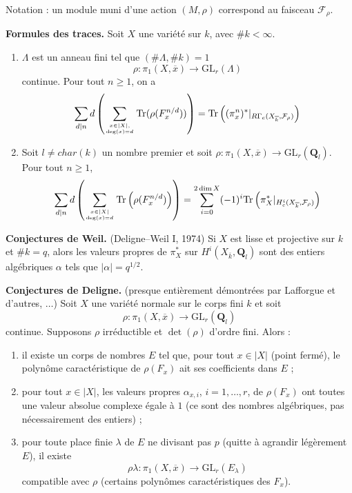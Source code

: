\noindent
Notation : un module muni d'une action $(M, \rho)$ correspond au faisceau
$\mathcal{F}_\rho$.

\medskip\noindent
{\bf Formules des traces.} Soit $X$ une variété sur $k$, avec $\# k < \infty$.
\begin{enumerate}
\item $\Lambda$ est un anneau fini tel que $(\# \Lambda, \# k)=1$
$$
\rho : \pi_1(X, \overline{x})\to \text{GL}_r(\Lambda)
$$
continue. Pour tout $n\geq 1$, on a
$$
\sum_{d|n}d\left(
\sum_{x\in |X|, \atop \deg(x)=d}
\text{Tr}(\rho(F_x^{n/d}))\right) =
\text{Tr}\left(
(\pi_x^n)^* |_{R\Gamma_c(X_{\overline{k}}, \mathcal{F}_\rho)}\right)
$$
\item Soit $l\neq char(k)$ un nombre premier et soit $\rho : \pi_1(X, \overline{x})\to
\text{GL}_r(\mathbf{Q}_l)$. Pour tout $n\geq 1$,
$$
\sum_{d|n} d\left(
\sum_{x\in |X| \atop \deg(x)=d}
\text{Tr}
\left(
\rho(F_x^{n/d})
\right)
\right) =
\sum_{i = 0}^{2\dim X}
(-1)^i
\text{Tr}\left(
\pi_X^* |_{H_c^i(X_{\overline{k}}, \mathcal{F}_\rho)}\right)
$$
\end{enumerate}

\noindent
{\bf Conjectures de Weil.} (Deligne--Weil I, 1974) Si $X$ est lisse et projective sur $k$ et
$\# k = q$, alors les valeurs propres de $\pi_X^*$ sur $H^i(X_{\overline{k}},
\mathbf{Q}_l)$ sont des entiers algébriques $\alpha$ tels que $|\alpha|=q^{1/2}$.

\medskip\noindent
{\bf Conjectures de Deligne.} (presque entièrement démontrées par
Lafforgue et d'autres, $\ldots$) Soit $X$ une variété normale sur le corps fini $k$ et soit
$$
\rho : \pi_1(X, \overline{x}) \longrightarrow \text{GL}_r(\mathbf{Q}_l)
$$
continue. Supposons $\rho$ irréductible et $\det(\rho)$ d'ordre fini. Alors :
\begin{enumerate}
\item il existe un corps de nombres $E$ tel que, pour tout $x\in
|X|$ (point fermé), le polynôme caractéristique de $\rho(F_x)$ ait ses coefficients dans $E$ ;
\item pour tout $x\in |X|$, les valeurs propres $\alpha_{x, i}$, $i = 1, \ldots,
r$, de $\rho(F_x)$ ont toutes une valeur absolue complexe égale à $1$
(ce sont des nombres algébriques, pas nécessairement des entiers) ;
\item pour toute place finie $\lambda$ de $E$ ne divisant pas $p$
(quitte à agrandir légèrement $E$), il existe
$$
\rho\lambda : \pi_1(X, \overline{x}) \to \text{GL}_r(E_\lambda)
$$
compatible avec $\rho$ (certains polynômes caractéristiques des $F_x$).
\end{enumerate}

